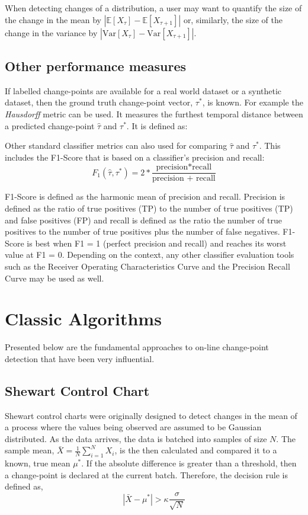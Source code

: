 When detecting changes of a distribution, a user may want to quantify the size of the change in the mean by
$|\mathbb{E}[X_{\tau}]-\mathbb{E}[X_{\tau+1}]|$ or, similarly, the size of the change in the variance by $|\text{Var}[X_{\tau}]-\text{Var}[X_{\tau+1}]|$.

\subsection{Other performance measures}

If labelled change-points are available for a real world dataset or a synthetic dataset, then the ground truth change-point vector, $\tau^*$, is known. For example the \textit{Hausdorff} metric can be used. It measures the furthest temporal distance between a predicted change-point $\hat{\tau}$ and $\tau^*$. It is defined as:

Other standard classifier metrics can also used for comparing $\hat{\tau}$ and $\tau^*$. This includes the  F1-Score that is based on a classifier's precision and recall:
\begin{equation}
F_1(\hat{\tau}, \tau^*) = 2 * \frac{\text{precision*recall}}{\text{precision + recall}}
\end{equation}

 F1-Score is defined as the harmonic mean of precision and recall. Precision is defined as the ratio of true positives (TP) to the
number of true positives (TP) and false positives (FP) and recall is defined as the ratio the number of true positives to the
number of true positives plus the number of false negatives. F1-Score is best when F1 = 1 (perfect precision and recall) and reaches its worst value at F1 = 0. Depending on the context, any other classifier evaluation tools such as the Receiver Operating Characteristics Curve and the Precision Recall Curve may be used as well.

\section{Classic Algorithms}
Presented below are the fundamental approaches to on-line change-point detection that have been very influential. 

\subsection{Shewart Control Chart}
Shewart control charts were originally designed to detect changes in the mean of a process where the values being observed are assumed to be Gaussian distributed. As the data arrives, the data is batched into samples of size $N$. The sample mean, $\bar{X}=\frac{1}{N} \sum_{i=1}^N X_i$, is the then calculated and compared it to a known, true mean $\mu^*$. If the absolute difference is greater than a threshold, then a change-point is declared at the current batch. Therefore, the decision rule is defined as,
\begin{equation}
|\bar{X}-\mu^*| > \kappa \frac{\sigma}{\sqrt{N}}
\end{equation}

